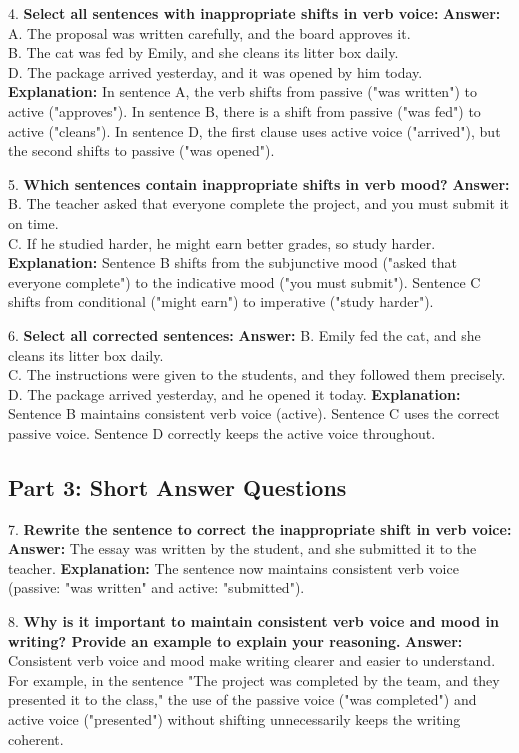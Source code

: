 \documentclass[12pt]{article}
\begin{document}
4. \textbf{Select all sentences with inappropriate shifts in verb voice:}  
\textbf{Answer:} A. The proposal was written carefully, and the board approves it. \\
B. The cat was fed by Emily, and she cleans its litter box daily. \\
D. The package arrived yesterday, and it was opened by him today.  
\textbf{Explanation:} In sentence A, the verb shifts from passive ("was written") to active ("approves"). In sentence B, there is a shift from passive ("was fed") to active ("cleans"). In sentence D, the first clause uses active voice ("arrived"), but the second shifts to passive ("was opened").  

\vspace{1cm}
5. \textbf{Which sentences contain inappropriate shifts in verb mood?}  
\textbf{Answer:} B. The teacher asked that everyone complete the project, and you must submit it on time. \\
C. If he studied harder, he might earn better grades, so study harder.  
\textbf{Explanation:} Sentence B shifts from the subjunctive mood ("asked that everyone complete") to the indicative mood ("you must submit"). Sentence C shifts from conditional ("might earn") to imperative ("study harder").

\vspace{1cm}
6. \textbf{Select all corrected sentences:}  
\textbf{Answer:} B. Emily fed the cat, and she cleans its litter box daily. \\
C. The instructions were given to the students, and they followed them precisely. \\
D. The package arrived yesterday, and he opened it today.  
\textbf{Explanation:} Sentence B maintains consistent verb voice (active). Sentence C uses the correct passive voice. Sentence D correctly keeps the active voice throughout.

\subsection*{Part 3: Short Answer Questions}

7. \textbf{Rewrite the sentence to correct the inappropriate shift in verb voice:}  
\textbf{Answer:} The essay was written by the student, and she submitted it to the teacher.  
\textbf{Explanation:} The sentence now maintains consistent verb voice (passive: "was written" and active: "submitted").

\vspace{1cm}
8. \textbf{Why is it important to maintain consistent verb voice and mood in writing? Provide an example to explain your reasoning.}  
\textbf{Answer:} Consistent verb voice and mood make writing clearer and easier to understand. For example, in the sentence "The project was completed by the team, and they presented it to the class," the use of the passive voice ("was completed") and active voice ("presented") without shifting unnecessarily keeps the writing coherent.
\end{document}
